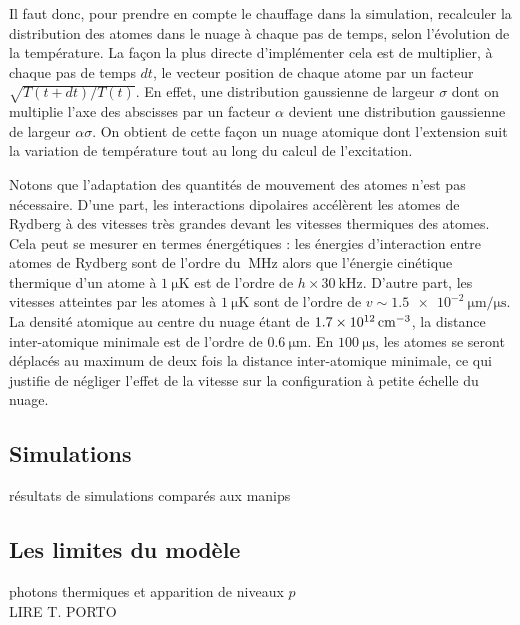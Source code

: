 Il faut donc, pour prendre en compte le chauffage dans la simulation, recalculer la distribution des atomes dans le nuage à chaque pas de temps, selon l'évolution de la température.
La façon la plus directe d'implémenter cela est de multiplier, à chaque pas de temps $dt$, le vecteur position de chaque atome par un facteur $\sqrt{T(t+dt)/T(t)}$.
En effet, une distribution gaussienne de largeur $\sigma$ dont on multiplie l'axe des abscisses par un facteur $\alpha$ devient une distribution gaussienne de largeur $\alpha\sigma$.
On obtient de cette façon un nuage atomique dont l'extension suit la variation de température tout au long du calcul de l'excitation.

Notons que l'adaptation des quantités de mouvement des atomes n'est pas nécessaire.
D'une part, les interactions dipolaires accélèrent les atomes de Rydberg à des vitesses très grandes devant les vitesses thermiques des atomes.
Cela peut se mesurer en termes énergétiques : les énergies d'interaction entre atomes de Rydberg sont de l'ordre du $\SI{}{\MHz}$ alors que l'énergie cinétique thermique d'un atome à $\SI{1}{\micro\K}$ est de l'ordre de $h\times \SI{30}{\kHz}$.
D'autre part, les vitesses atteintes par les atomes à $\SI{1}{\micro\K}$ sont de l'ordre de $v\sim \SI{1.5e-2}{\um/\us}$.
La densité atomique au centre du nuage étant de $\SI{1.7e12}{\per\raiseto{3}\cm}$, la distance inter-atomique minimale est de l'ordre de $\SI{0.6}{\um}$.
En $\SI{100}{\us}$, les atomes se seront déplacés au maximum de deux fois la distance inter-atomique minimale, ce qui justifie de négliger l'effet de la vitesse sur la configuration à petite échelle du nuage.

	\subsection{Simulations}
		\noindent résultats de simulations comparés aux manips\\
	\subsection{Les limites du modèle}
		\noindent photons thermiques et apparition de niveaux $p$ \\
		LIRE T. PORTO
		
